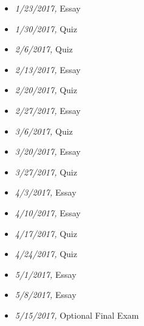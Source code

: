\documentclass[article,oneside]{memoir}
\begin{document}
\begin{itemize}
\item \textit{1/23/2017,} Essay 
\item \textit{1/30/2017,} Quiz 
\item \textit{2/6/2017,} Quiz
\item \textit{2/13/2017,} Essay 
\item \textit{2/20/2017,} Quiz 
\item \textit{2/27/2017,} Essay 
\item \textit{3/6/2017,}  Quiz 
\item \textit{3/20/2017,} Essay 
\item \textit{3/27/2017,}  Quiz 
\item \textit{4/3/2017,} Essay 
\item \textit{4/10/2017,} Essay 
\item \textit{4/17/2017,} Quiz
\item \textit{4/24/2017,} Quiz 
\item \textit{5/1/2017,} Essay 
\item \textit{5/8/2017,} Essay 
\item \textit{5/15/2017,} Optional Final Exam  
\end{itemize}



\end{document}
